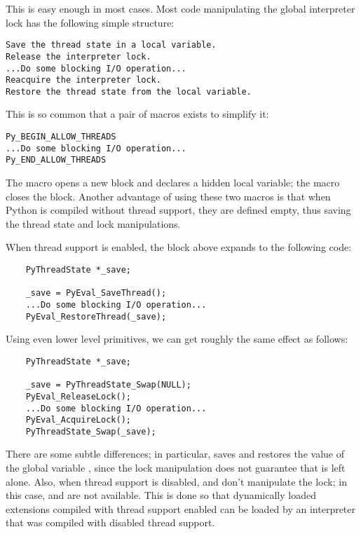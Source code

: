 \documentclass{manual}
\begin{document}
This is easy enough in most cases.  Most code manipulating the global
interpreter lock has the following simple structure:

\begin{verbatim}
Save the thread state in a local variable.
Release the interpreter lock.
...Do some blocking I/O operation...
Reacquire the interpreter lock.
Restore the thread state from the local variable.
\end{verbatim}

This is so common that a pair of macros exists to simplify it:

\begin{verbatim}
Py_BEGIN_ALLOW_THREADS
...Do some blocking I/O operation...
Py_END_ALLOW_THREADS
\end{verbatim}

The  macro
opens a new block and declares a hidden local variable; the
 macro closes 
the block.  Another advantage of using these two macros is that when
Python is compiled without thread support, they are defined empty,
thus saving the thread state and lock manipulations.

When thread support is enabled, the block above expands to the
following code:

\begin{verbatim}
    PyThreadState *_save;

    _save = PyEval_SaveThread();
    ...Do some blocking I/O operation...
    PyEval_RestoreThread(_save);
\end{verbatim}

Using even lower level primitives, we can get roughly the same effect
as follows:

\begin{verbatim}
    PyThreadState *_save;

    _save = PyThreadState_Swap(NULL);
    PyEval_ReleaseLock();
    ...Do some blocking I/O operation...
    PyEval_AcquireLock();
    PyThreadState_Swap(_save);
\end{verbatim}

There are some subtle differences; in particular,
 saves
and restores the value of the  global variable
, since the lock manipulation does not
guarantee that  is left alone.  Also, when thread support
is disabled,
 and
 don't manipulate the lock; in this
case,  and
 are not
available.  This is done so that dynamically loaded extensions
compiled with thread support enabled can be loaded by an interpreter
that was compiled with disabled thread support.
\end{document}
